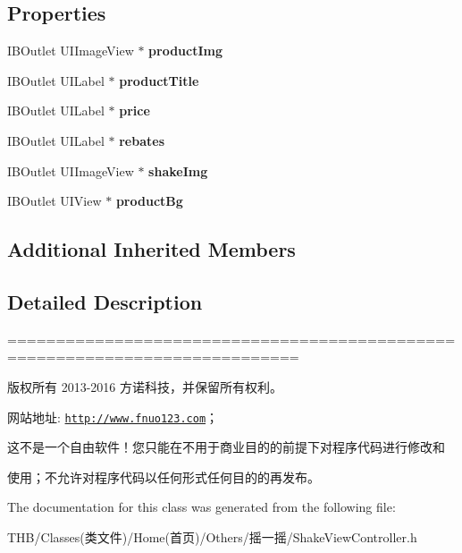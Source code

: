 \subsection*{Properties}
\begin{DoxyCompactItemize}
\item 
\mbox{\label{interface_shake_view_controller_a69007e27de87a9579c21278fc6fe2c22}} 
I\+B\+Outlet U\+I\+Image\+View $\ast$ {\bfseries product\+Img}
\item 
\mbox{\label{interface_shake_view_controller_a58cb13a5ab5557f4ec2303b9d5528870}} 
I\+B\+Outlet U\+I\+Label $\ast$ {\bfseries product\+Title}
\item 
\mbox{\label{interface_shake_view_controller_a456e009579433aee6aa8f8fafaa47b9a}} 
I\+B\+Outlet U\+I\+Label $\ast$ {\bfseries price}
\item 
\mbox{\label{interface_shake_view_controller_a33631500d238e197f5257469c8d2e298}} 
I\+B\+Outlet U\+I\+Label $\ast$ {\bfseries rebates}
\item 
\mbox{\label{interface_shake_view_controller_abb5215fd10a80160043e66c0d5f03cf5}} 
I\+B\+Outlet U\+I\+Image\+View $\ast$ {\bfseries shake\+Img}
\item 
\mbox{\label{interface_shake_view_controller_abd0aea6c67d9e2e352c4e2bb495f60ec}} 
I\+B\+Outlet U\+I\+View $\ast$ {\bfseries product\+Bg}
\end{DoxyCompactItemize}
\subsection*{Additional Inherited Members}


\subsection{Detailed Description}
============================================================================

版权所有 2013-\/2016 方诺科技，并保留所有权利。

网站地址\+: \href{http://www.fnuo123.com}{\tt http\+://www.\+fnuo123.\+com}； 



这不是一个自由软件！您只能在不用于商业目的的前提下对程序代码进行修改和

使用；不允许对程序代码以任何形式任何目的的再发布。 

 

The documentation for this class was generated from the following file\+:\begin{DoxyCompactItemize}
\item 
T\+H\+B/\+Classes(类文件)/\+Home(首页)/\+Others/摇一摇/Shake\+View\+Controller.\+h\end{DoxyCompactItemize}
